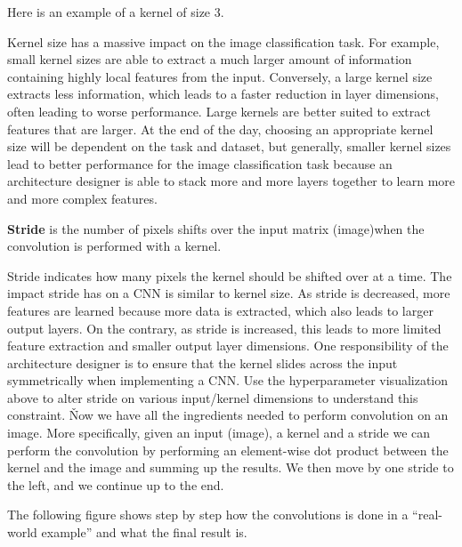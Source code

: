\be
Here is an example of a kernel of size 3.

\vspace{-10pt}


\vspace{-10pt}
\ee

Kernel size has a massive impact on the image classification task. For example, small kernel sizes are able to 
extract a much larger amount of information containing highly local features from the input. Conversely, a large 
kernel size extracts less information, which leads to a faster reduction in layer dimensions, often leading to worse
performance. Large kernels are better suited to extract features that are larger. At the end of the day, choosing an
appropriate kernel size will be dependent on the task and dataset, but generally, smaller kernel sizes lead to 
better performance for the image classification task because an architecture designer is able to stack more and more 
layers together to learn more and more complex features.

\bd[Stride]
\textbf{Stride} is the number of pixels shifts over the input matrix (image)when the convolution is performed with a
kernel.
\ed

Stride indicates how many pixels the kernel should be shifted over at a time. The impact stride has on a CNN is 
similar to kernel size. As stride is decreased, more features are learned because more data is extracted, which also
leads to larger output layers. On the contrary, as stride is increased, this leads to more limited feature 
extraction and smaller output layer dimensions. One responsibility of the architecture designer is to ensure that the
kernel slides across the input symmetrically when implementing a CNN. Use the hyperparameter visualization above to 
alter stride on various input/kernel dimensions to understand this constraint. \v

Now we have all the ingredients needed to perform convolution on an image. More specifically, given an input (image),
a kernel and a stride we can perform the convolution by performing an element-wise dot product between the kernel
and the image and summing up the results. We then move by one stride to the left, and we continue up to the end.

\be
The following figure shows step by step how the convolutions is done in a ``real-world example'' and what the final
result is.

\ee

